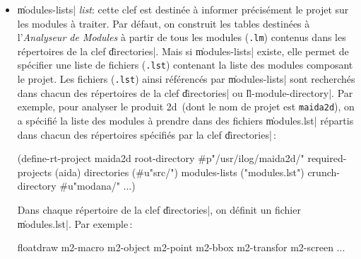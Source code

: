 \begin{itemize}
\begin{Code*}
(define-rt-project smeci
   required-projects (smstr)
   ...)
\end{Code*}

\begin{Side}{\bf Remarque}
On prendra \'{e}ventuellement soin de charger les
fichiers qui d\'{e}finissent les projets requis par \|required-project|.
Par exemple, si on utilise les librairies \LeLisp\ et \Aida\,:
\end{Side}
\begin{Code*}
^L/usr/ilog/lelisp/modana/lisp.prj
^L/usr/ilog/aida/modana/aida.prj

(define-rt-project myproject
 ...
\end{Code*}

\item {\Large \|modules-lists| {\em list}}: cette clef est
destin\'{e}e \`{a} informer 
pr\'{e}cis\'{e}ment le projet sur les modules \`{a} traiter. Par d\'{e}faut, on
construit les tables 
destin\'{e}es \`{a} l'{\em Analyseur de Modules} \`{a} partir de tous les modules
({\tt *.lm})
contenus dans les r\'{e}pertoires de la clef
\|directories|. Mais si \|modules-lists| existe, elle permet de
sp\'{e}cifier une liste de fichiers ({\tt *.lst}) contenant la liste des modules
composant le projet. Les fichiers ({\tt *.lst})  ainsi r\'{e}f\'{e}renc\'{e}s
par \|modules-lists| 
sont recherch\'{e}s dans chacun des 
r\'{e}pertoires de la clef \|directories| ou \|ll-module-directory|.
Par exemple, pour analyser le produit
\Masai2d\ (dont le nom de projet est {\tt maida2d}),
on a sp\'{e}cifi\'{e} la liste
des modules \`{a} prendre dans des fichiers \|modules.lst| r\'{e}partis 
dans chacun des r\'{e}pertoires sp\'{e}cifi\'{e}s par la clef \|directories|\,:

\begin{Code*}
(define-rt-project maida2d
        root-directory #p"/usr/ilog/maida2d/"
        required-projects (aida)  
        directories (#u"src/")
        modules-lists ("modules.lst")
        crunch-directory #u"modana/"
        ...)
\end{Code*}

Dans chaque r\'{e}pertoire de la clef \|directories|, on d\'{e}finit un
fichier \|modules.lst|. Par exemple\,:

\begin{Longcode*}
floatdraw
m2-macro
m2-object
m2-point
m2-bbox
m2-transfor
m2-screen
...
\end{Longcode*}


\end{itemize}
